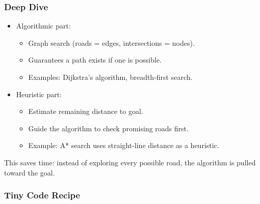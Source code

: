 \documentclass[
  letterpaper,
  DIV=11,
  numbers=noendperiod]{scrreprt}
\providecommand{\tightlist}{%
  \setlength{\itemsep}{0pt}\setlength{\parskip}{0pt}}
\begin{document}
\subsubsection{Deep Dive}\label{deep-dive-58}

\begin{itemize}
\item
  Algorithmic part:

  \begin{itemize}
  \tightlist
  \item
    Graph search (roads = edges, intersections = nodes).
  \item
    Guarantees a path exists if one is possible.
  \item
    Examples: Dijkstra's algorithm, breadth-first search.
  \end{itemize}
\item
  Heuristic part:

  \begin{itemize}
  \tightlist
  \item
    Estimate remaining distance to goal.
  \item
    Guide the algorithm to check promising roads first.
  \item
    Example: A* search uses straight-line distance as a heuristic.
  \end{itemize}
\end{itemize}

This saves time: instead of exploring every possible road, the algorithm
is pulled toward the goal.

\subsubsection{Tiny Code Recipe}\label{tiny-code-recipe-86}
\end{document}
